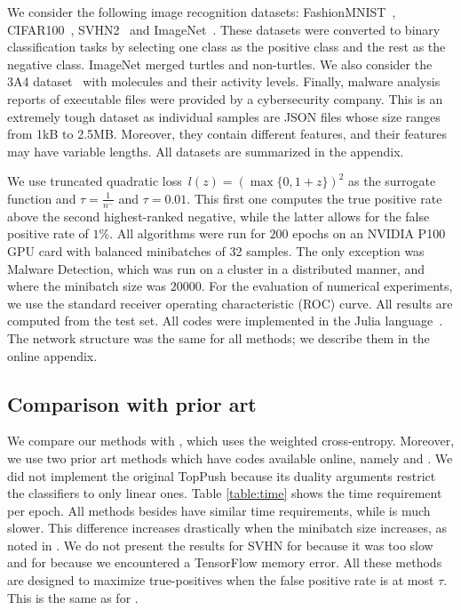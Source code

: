 We consider the following image recognition datasets: FashionMNIST~\cite{xiao2017fashionmnist}, CIFAR100~\cite{krizhevsky2009learning}, SVHN2~\cite{netzer2011reading} and ImageNet~\cite{russakovsky2015imagenet}. These datasets were converted to binary classification tasks by selecting one class as the positive class and the rest as the negative class. ImageNet merged turtles and non-turtles. We also consider the 3A4 dataset~\cite{ma2015deep} with molecules and their activity levels. Finally, malware analysis reports of executable files were provided by a cybersecurity company. This is an extremely tough dataset as individual samples are JSON files whose size ranges from 1kB to 2.5MB. Moreover, they contain different features, and their features may have variable lengths. All datasets are summarized in the appendix.

We use truncated quadratic loss~$l(z) = (\max\{0, 1 + z\})^2$ as the surrogate function and $\tau=\frac{1}{n^-}$ and $\tau=0.01$. This first one computes the true positive rate above the second highest-ranked negative, while the latter allows for the false positive rate of $1\%$. All algorithms were run for $200$ epochs on an NVIDIA P100 GPU card with balanced minibatches of 32 samples. The only exception was Malware Detection, which was run on a cluster in a distributed manner, and where the minibatch size was $20000$. For the evaluation of numerical experiments, we use the standard receiver operating characteristic (ROC) curve. All results are computed from the test set. All codes were implemented in the Julia language~\cite{bezanson2017julia}. The network structure was the same for all methods; we describe them in the online appendix.

\subsection{Comparison with prior art}\label{sec:comparison}

We compare our methods with \BaseLine, which uses the weighted cross-entropy. Moreover, we use two prior art methods which have codes available online, namely \TFCO \cite{cotter2019optimization,narasimhan2019optimizing} and \APPerf \cite{fathony2019ap}. We did not implement the original TopPush because its duality arguments restrict the classifiers to only linear ones. Table \ref{table:time} shows the time requirement per epoch. All methods besides \APPerf have similar time requirements, while \APPerf is much slower. This difference increases drastically when the minibatch size increases, as noted in \cite{fathony2019ap}. We do not present the results for SVHN for \APPerf because it was too slow and for \TFCO because we encountered a TensorFlow memory error. All these methods are designed to maximize true-positives when the false positive rate is at most $\tau$. This is the same as for \PatMatNP.

